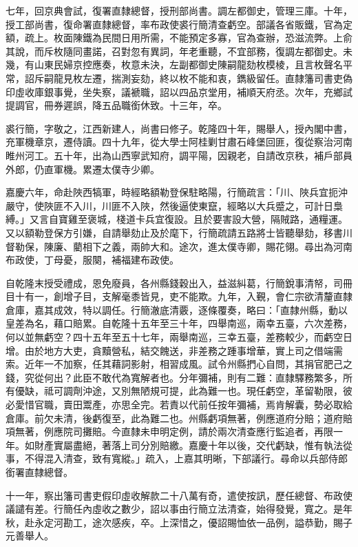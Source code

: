 \begin{pinyinscope}
七年，回京典會試，復署直隸總督，授刑部尚書。調左都御史，管理三庫。十年，授工部尚書，復命署直隸總督，率布政使裘行簡清查虧空。部議各省販鐵，官為定額，疏上。枚面陳鐵為民間日用所需，不能預定多寡，官為查辦，恐滋流弊。上俞其說，而斥枚隨同畫諾，召對忽有異詞，年老重聽，不宜部務，復調左都御史。未幾，有山東民婦京控應奏，枚意未決，左副都御史陳嗣龍劾枚模棱，且言枚聲名平常，詔斥嗣龍見枚左遷，揣測妄劾，終以枚不能和衷，鐫級留任。直隸籓司書吏偽印虛收庫銀事覺，坐失察，議褫職，詔以四品京堂用，補順天府丞。次年，充鄉試提調官，冊券遲誤，降五品職銜休致。十三年，卒。

裘行簡，字敬之，江西新建人，尚書曰修子。乾隆四十年，賜舉人，授內閣中書，充軍機章京，遷侍讀。四十九年，從大學士阿桂剿甘肅石峰堡回匪，復從察治河南睢州河工。五十年，出為山西寧武知府，調平陽，因親老，自請改京秩，補戶部員外郎，仍直軍機。累遷太僕寺少卿。

嘉慶六年，命赴陜西犒軍，時經略額勒登保駐略陽，行簡疏言：「川、陜兵宜扼沖嚴守，使陜匪不入川，川匪不入陜，然後逼使東竄，經略以大兵蹙之，可計日梟縛。」又言自寶雞至褒城，棧道卡兵宜復設。且於要害設大營，隔賊路，通糧運。又以額勒登保方引嫌，自請舉劾止及於麾下，行簡疏請五路將士皆聽舉劾，移書川督勒保，陳廉、藺相下之義，兩帥大和。途次，進太僕寺卿，賜花翎。尋出為河南布政使，丁母憂，服闋，補福建布政使。

自乾隆末授受禮成，恩免廢員，各州縣錢穀出入，益滋糾葛，行簡銳事清帑，司冊目十有一，創增子目，支解毫黍皆見，吏不能欺。九年，入覲，會仁宗欲清釐直隸倉庫，嘉其成效，特以調任。行簡澈底清覈，逐條覆奏，略曰：「直隸州縣，動以皇差為名，藉口賠累。自乾隆十五年至三十年，四舉南巡，兩幸五臺，六次差務，何以並無虧空？四十五年至五十七年，兩舉南巡，三幸五臺，差務較少，而虧空日增。由於地方大吏，貪黷營私，結交餽送，非差務之踵事增華，實上司之借端需索。近年一不加察，任其藉詞影射，相習成風。試令州縣捫心自問，其捐官肥己之錢，究從何出？此臣不敢代為寬解者也。分年彌補，則有二難：直隸驛務繁多，所有優缺，祗可調劑沖途，又別無陋規可提，此為難一也。現任虧空，革留勒限，彼必愛惜官職，賣田鬻產，亦思全完。若責以代前任按年彌補，焉肯解囊，勢必取給倉庫。前欠未清，後虧復至，此為難二也。州縣虧項無著，例應道府分賠；道府賠項無著，例應院司攤賠。今直隸未申明定例，請於兩次清查應行監追者，再限一年。如財產實屬盡絕，著落上司分別賠繳。嘉慶十年以後，交代虧缺，惟有執法從事，不得混入清查，致有寬縱。」疏入，上嘉其明晰，下部議行。尋命以兵部侍郎銜署直隸總督。

十一年，察出籓司書吏假印虛收解款二十八萬有奇，遣使按訊，歷任總督、布政使議譴有差。行簡任內虛收之數少，詔以事由行簡立法清查，始得發覺，寬之。是年秋，赴永定河勘工，途次感疾，卒。上深惜之，優詔賜恤依一品例，謚恭勤，賜子元善舉人。


\end{pinyinscope}
